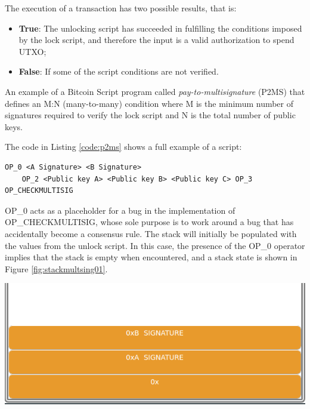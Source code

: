 The execution of a transaction has two possible results, that is: 

\begin{itemize}
    \item {\bf True}: The unlocking script has succeeded in fulfilling the 
        conditions imposed by the lock script, 
        and therefore the input is a valid authorization to spend UTXO;
    \item {\bf False}: If some of the script conditions are not verified.
\end{itemize}

\begin{example}\label{ex:p2ms_example}
    An example of a Bitcoin Script program called \emph{pay-to-multisignature} (P2MS)
    that defines an M:N (many-to-many) condition where M is the minimum number of signatures required 
    to verify the lock script and N is the total number of public keys. 

    The code in Listing \ref{code:p2ms} shows a full example of a script:

    \begin{lstlisting}[language=bitcoinscript, caption={Full example of pay-to-multisignature script.}, label={code:p2ms}]
    OP_0 <A Signature> <B Signature>
    OP_2 <Public key A> <Public key B> <Public key C> OP_3 OP_CHECKMULTISIG
    \end{lstlisting}

    OP\_0 acts as a placeholder for a bug in the implementation of OP\_CHECKMULTISIG, 
    whose sole purpose is to work around a bug that has accidentally become a consensus rule. The stack 
    will initially be populated with the values from the unlock script.
    In this case, the presence of the OP\_0 operator implies that the stack is empty when encountered, and 
    a stack state is shown in Figure \ref{fig:stackmultsing01}.

    {\centering
    \vspace{15pt}
    \includegraphics[scale=0.35]{imgs/script/multisig/1.png}
    \vspace{10pt}
    \par}


\end{example}
